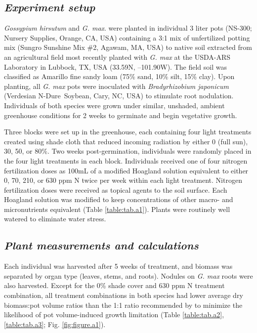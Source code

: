 \subsection{\textit{Experiment setup}}
\noindent \textit{Gossypium hirsutum} and \textit{G. max}. were planted in individual 3 liter pots (NS-300; Nursery Supplies, Orange, CA, USA) containing a 3:1 mix of unfertilized potting mix (Sungro Sunshine Mix \#2, Agawam, MA, USA) to native soil extracted from an agricultural field most recently planted with \textit{G. max} at the USDA-ARS Laboratory in Lubbock, TX, USA (33.59\textdegree{}N, –101.90\textdegree{}W). The field soil was classified as Amarillo fine sandy loam (75\% sand, 10\% silt, 15\% clay). Upon planting, all \textit{G. max} pots were inoculated with \textit{Bradyrhizobium japonicum} (Verdesian N-Dure\texttrademark\ Soybean, Cary, NC, USA) to stimulate root nodulation. Individuals of both species were grown under similar, unshaded, ambient greenhouse conditions for 2 weeks to germinate and begin vegetative growth. 

Three blocks were set up in the greenhouse, each containing four light treatments created using shade cloth that reduced incoming radiation by either 0 (full sun), 30, 50, or 80\%. Two weeks post-germination, individuals were randomly placed in the four light treatments in each block. Individuals received one of four nitrogen fertilization doses as 100mL of a modified Hoagland solution  equivalent to either 0, 70, 210, or 630 ppm N twice per week within each light treatment. Nitrogen fertilization doses were received as topical agents to the soil surface. Each Hoagland solution was modified to keep concentrations of other macro- and micronutrients equivalent (Table \ref{table:tab.a1}). Plants were routinely well watered to eliminate water stress.

\subsection{\textit{Plant measurements and calculations}}
\noindent Each individual was harvested after 5 weeks of treatment, and biomass was separated by organ type (leaves, stems, and roots). Nodules on \textit{G. max} roots were also harvested. Except for the 0\% shade cover and 630 ppm N treatment combination, all treatment combinations in both species had lower average dry biomass:pot volume ratios than the 1:1 ratio recommended by  to minimize the likelihood of pot volume-induced growth limitation (Table \ref{table:tab.a2}, \ref{table:tab.a3}; Fig. \ref{fig:figure.a1}). 

